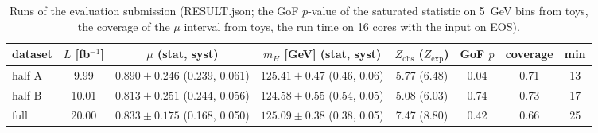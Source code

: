 \documentclass[11pt,a4paper]{article}
\begin{document}
\begin{table}[H]\centering\small\begin{tabular}{lccccccc}\toprule dataset & $L$ [fb$^{-1}$] & $\mu$ (stat, syst) & $m_H$ [GeV] (stat, syst) & $Z_\mathrm{obs}$ ($Z_\mathrm{exp}$) & GoF $p$ & coverage & min\\\midrule
half A & 9.99 & $0.890\pm0.246$ (0.239, 0.061) & $125.41\pm0.47$ (0.46, 0.06) & 5.77 (6.48) & 0.04 & 0.71 & 13\\
half B & 10.01 & $0.813\pm0.251$ (0.244, 0.056) & $124.58\pm0.55$ (0.54, 0.05) & 5.08 (6.03) & 0.74 & 0.73 & 17\\
full & 20.00 & $0.833\pm0.175$ (0.168, 0.050) & $125.09\pm0.38$ (0.38, 0.05) & 7.47 (8.80) & 0.42 & 0.66 & 25\\
\bottomrule\end{tabular}\caption{Runs of the evaluation submission (RESULT.json; the GoF $p$-value of the saturated statistic on 5~GeV bins from toys, the coverage of the $\mu$ interval from toys, the run time on 16 cores with the input on EOS).}\end{table}
\end{document}
